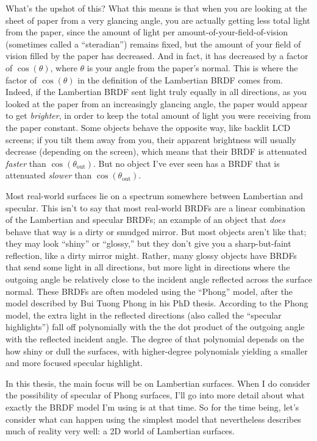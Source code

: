     What's the upshot of this? What this means is that when you are looking at the sheet of paper from a very glancing angle, you are actually getting less total light from the paper, since the amount of light per amount-of-your-field-of-vision (sometimes called a ``steradian'') remains fixed, but the amount of your field of vision filled by the paper has decreased. And in fact, it has decreased by a factor of $\cos(\theta)$, where $\theta$ is your angle from the paper's normal. This is where the factor of $\cos(\theta)$ in the definition of the Lambertian BRDF comes from. Indeed, if the Lambertian BRDF sent light truly equally in all directions, as you looked at the paper from an increasingly glancing angle, the paper would appear to get \emph{brighter}, in order to keep the total amount of light you were receiving from the paper constant. Some objects behave the opposite way, like backlit LCD screens; if you tilt them away from you, their apparent brightness will usually decrease (depending on the screen), which means that their BRDF is attenuated \emph{faster} than $\cos(\theta_{\textrm{out}})$. But no object I've ever seen has a BRDF that is attenuated \emph{slower} than $\cos(\theta_{\textrm{out}})$.

    Most real-world surfaces lie on a spectrum somewhere between Lambertian and specular. This isn't to say that most real-world BRDFs are a linear combination of the Lambertian and specular BRDFs; an example of an object that \emph{does} behave that way is a dirty or smudged mirror. But most objects aren't like that; they may look ``shiny'' or ``glossy,'' but they don't give you a sharp-but-faint reflection, like a dirty mirror might. Rather, many glossy objects have BRDFs that send some light in all directions, but more light in directions where the outgoing angle be relatively close to the incident angle reflected across the surface normal. These BRDFs are often modeled using the ``Phong'' model, after the model described by Bui Tuong Phong in his PhD thesis. According to the Phong model, the extra light in the reflected directions (also called the ``specular highlights'') fall off polynomially with the the dot product of the outgoing angle with the reflected incident angle. The degree of that polynomial depends on the how shiny or dull the surfaces, with higher-degree polynomials yielding a smaller and more focused specular highlight.
    
    In this thesis, the main focus will be on Lambertian surfaces. When I do consider the possibility of specular of Phong surfaces, I'll go into more detail about what exactly the BRDF model I'm using is at that time. So for the time being, let's consider what can happen using the simplest model that nevertheless describes much of reality very well: a 2D world of Lambertian surfaces.
    
